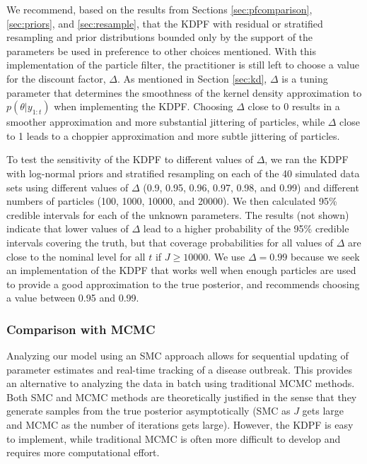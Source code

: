 \documentclass{elsarticle}
\begin{document}
We recommend, based on the results from Sections \ref{sec:pfcomparison}, \ref{sec:priors}, and \ref{sec:resample}, that the KDPF with residual or stratified resampling and prior distributions bounded only by the support of the parameters be used in preference to other choices mentioned. With this implementation of the particle filter, the practitioner is still left to choose a value for the discount factor, $\Delta$. As mentioned in Section \ref{sec:kd}, $\Delta$ is a tuning parameter that determines the smoothness of the kernel density approximation to $p(\theta|y_{1:t})$ when implementing the KDPF. Choosing $\Delta$ close to 0 results in a smoother approximation and more substantial jittering of particles, while $\Delta$ close to 1 leads to a choppier approximation and more subtle jittering of particles.

To test the sensitivity of the KDPF to different values of $\Delta$, we ran the KDPF with log-normal priors and stratified resampling on each of the 40 simulated data sets using different values of $\Delta$ (0.9, 0.95, 0.96, 0.97, 0.98, and 0.99) and different numbers of particles (100, 1000, 10000, and 20000). We then calculated 95\% credible intervals for each of the unknown parameters. The results (not shown) indicate that lower values of $\Delta$ lead to a higher probability of the 95\% credible intervals covering the truth, but that coverage probabilities for all values of $\Delta$ are close to the nominal level for all $t$ if $J \ge 10000$. We use $\Delta = 0.99$ because we seek an implementation of the KDPF that works well when enough particles are used to provide a good approximation to the true posterior, and \citet{Liu:West:comb:2001} recommends choosing a value between 0.95 and 0.99.

\subsubsection{Comparison with MCMC}

Analyzing our model using an SMC approach allows for sequential updating of parameter estimates and real-time tracking of a disease outbreak. This provides an alternative to analyzing the data in batch using traditional MCMC methods. Both SMC and MCMC methods are theoretically justified in the sense that they generate samples from the true posterior asymptotically (SMC as $J$ gets large and MCMC as the number of iterations gets large). However, the KDPF is easy to implement, while traditional MCMC is often more difficult to develop and requires more computational effort.
\end{document}
